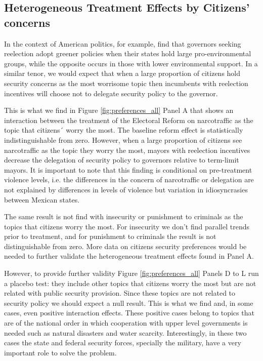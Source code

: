 \subsection{Heterogeneous Treatment Effects by Citizens' concerns}

In the context of American politics, for example, \citet{list_sturm_2006} find that governors seeking reelection adopt greener policies when their states hold large pro-environmental groups, while the opposite occurs in those with lower environmental support. In a similar tenor, we would expect that when a large proportion of citizens hold security concerns as the most worrisome topic then incumbents with reelection incentives will choose not to delegate security policy to the governor.   

This is what we find in Figure \ref{fig:preferences_all} Panel A that shows an interaction between the treatment of the Electoral Reform on narcotraffic as the topic that citizens´ worry the most. The baseline reform effect is statistically indistinguishable from zero. However, when a large proportion of citizens see narcotraffic as the topic they worry the most, mayors with reelection incentives decrease the delegation of security policy to governors relative to term-limit mayors. It is important to note that this finding is conditional on    pre-treatment violence levels, i.e. the differences in the concern of narcotraffic or delegation are not explained by differences in levels of violence but variation in idiosyncrasies between Mexican states.

 The same result is not find with insecurity or punishment to criminals as the topics that citizens worry the most. For insecurity we don't find parallel trends prior to treatment, and for punishment to criminals the result is not distinguishable from zero. More data on citizens security preferences would be needed to further validate the heterogeneous treatment effects found in Panel A. 
 
 However, to provide further validity Figure \ref{fig:preferences_all} Panels D to L run a placebo test:  they include other topics that citizens worry the most but are not related with public security provision. Since these topics are not related to security policy we should expect a null result. This is what we find and, in some cases, even positive interaction effects. These positive cases belong to topics that are of the national order in which cooperation with upper level governments is needed such as natural disasters and water scarcity. Interestingly, in these two cases the state and federal security forces, specially the military, have a very important role to solve the problem. 
 
